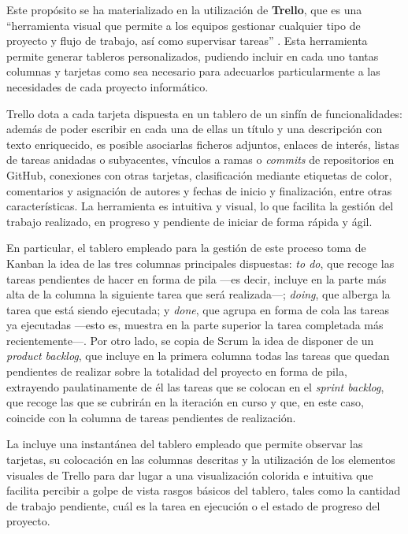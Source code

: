 Este propósito se ha materializado en la utilización de \textbf{Trello}, que es una ``herramienta visual que permite a los equipos gestionar cualquier tipo de proyecto y flujo de trabajo, así como supervisar tareas'' \cite{Trello}. Esta herramienta permite generar tableros personalizados, pudiendo incluir en cada uno tantas columnas y tarjetas como sea necesario para adecuarlos particularmente a las necesidades de cada proyecto informático.

Trello dota a cada tarjeta dispuesta en un tablero de un sinfín de funcionalidades: además de poder escribir en cada una de ellas un título y una descripción con texto enriquecido, es posible asociarlas ficheros adjuntos, enlaces de interés, listas de tareas anidadas o subyacentes, vínculos a ramas o \textit{commits} de repositorios en GitHub, conexiones con otras tarjetas, clasificación mediante etiquetas de color, comentarios y asignación de autores y fechas de inicio y finalización, entre otras características. La herramienta es intuitiva y visual, lo que facilita la gestión del trabajo realizado, en progreso y pendiente de iniciar de forma rápida y ágil.

En particular, el tablero empleado para la gestión de este proceso toma de Kanban la idea de las tres columnas principales dispuestas: \textit{to do}, que recoge las tareas pendientes de hacer en forma de pila ---es decir, incluye en la parte más alta de la columna la siguiente tarea que será realizada---; \textit{doing}, que alberga la tarea que está siendo ejecutada; y \textit{done}, que agrupa en forma de cola las tareas ya ejecutadas ---esto es, muestra en la parte superior la tarea completada más recientemente---. Por otro lado, se copia de Scrum la idea de disponer de un \textit{product backlog}, que incluye en la primera columna todas las tareas que quedan pendientes de realizar sobre la totalidad del proyecto en forma de pila, extrayendo paulatinamente de él las tareas que se colocan en el \textit{sprint backlog}, que recoge las que se cubrirán en la iteración en curso y que, en este caso, coincide con la columna de tareas pendientes de realización.

La  incluye una instantánea del tablero empleado que permite observar las tarjetas, su colocación en las columnas descritas y la utilización de los elementos visuales de Trello para dar lugar a una visualización colorida e intuitiva que facilita percibir a golpe de vista rasgos básicos del tablero, tales como la cantidad de trabajo pendiente, cuál es la tarea en ejecución o el estado de progreso del proyecto.

